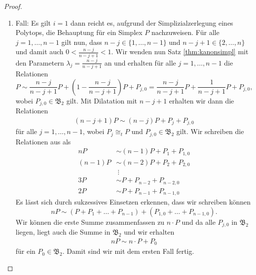 \documentclass[11pt,titlepage]{article}
\theoremstyle{definition}
\theoremstyle{remark}
\begin{document}
	\begin{proof}
		\noindent
		\begin{enumerate}
			\item Fall: Es gilt $i=1$ dann reicht es, aufgrund 
			der Simplizialzerlegung eines Polytops, die 
			Behauptung für ein Simplex $P$ nachzuweisen. Für alle $j=1,\ldots,n-1$ 
			gilt nun, dass $n-j\in\{1,\ldots,n-1\}$ und $n-j+1\in\{2,\ldots,n\}$ 
			und damit auch $0<\frac{n-j}{n-j+1}<1$. Wir wenden nun  
			Satz \ref{thm:kanonsimpl} mit den Parametern 
			$\lambda_j=\frac{n-j}{n-j+1}$ an und 
			erhalten für alle $j=1,\ldots,n-1$ die Relationen 
			\[P\sim \frac{n-j}{n-j+1} P+\left(1-\frac{n-j}{n-j+1}\right)P+P_{j,0}
			=\frac{n-j}{n-j+1}P+\frac{1}{n-j+1}P+P_{j,0},\]
			wobei $P_{j,0}\in\mathfrak{B}_2$ gilt. Mit Dilatation mit 
			$n-j+1$ erhalten wir dann die Relationen 
			\begin{align*}
				(n-j +1)P\sim(n-j )P+P_j+P_{j, 0} 
			\end{align*}
			für alle $j=1,\ldots,n-1$, wobei $P_{j}\cong_t P$ und 
			$P_{j, 0}\in\mathfrak{B}_2$ gilt. Wir schreiben die Relationen 
			aus als
			\begin{align*}
				nP &\sim (n-1)P+P_1+P_{1,0} \\
				(n-1)P &\sim (n-2)P+P_2 +P_{2,0} \\
				&\ \vdots \\
				3P &\sim P +P_{n-2}+P_{n-2,0} \\
				2P &\sim P +P_{n-1}+P_{n-1,0}
			\end{align*}
			Es lässt sich durch sukzessives Einsetzen erkennen, dass wir 
			schreiben können 
			\[nP\sim (P+P_1+\ldots+P_{n-1})+(P_{1,0}+\ldots+P_{n-1,0}).\]
			Wir können die erste Summe zusammenfassen zu $n \cdot P$ 
			und da alle $P_{j,0}$ in $\mathfrak{B}_2$ liegen, liegt auch 
			die Summe in $\mathfrak{B}_2$ und wir erhalten
			\begin{align}
				nP\sim n\cdot P+ P_0 \label{thm:zyl;1}
			\end{align}
			für ein $P_0\in\mathfrak{B}_2$. Damit sind wir mit dem 
			ersten Fall fertig.
			

\end{enumerate}
\end{proof}
\end{document}
